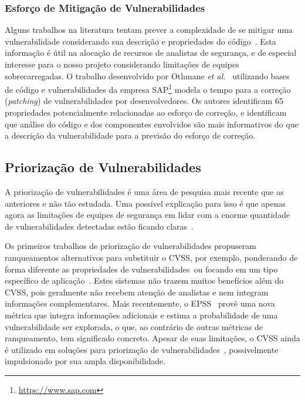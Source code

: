 \subsubsection{Esforço de Mitigação de Vulnerabilidades}

Alguns trabalhos na literatura tentam prever a complexidade de se mitigar uma vulnerabilidade considerando sua descrição e propriedades do código~\cite{zhang2013predicting}. Esta informação é útil na alocação de recursos de analistas de segurança, e de especial interesse para o nosso projeto considerando limitações de equipes sobrecarregadas. O trabalho desenvolvido por Othmane \emph{et al.}~\cite{ben2015factors, ben2017time} utilizando bases de código e vulnerabilidades da empresa SAP\footnote{\url{https://www.sap.com}} modela o tempo para a correção (\emph{patching}) de vulnerabilidades por desenvolvedores. Os autores identificam 65 propriedades potencialmente relacionadas ao esforço de correção, e identificam que análise do código e dos componentes envolvidos são mais informativos do que a descrição da vulnerabilidade para a previsão do esforço de correção.

\subsection{Priorização de Vulnerabilidades}\label{sec:art.prio}

A priorização de vulnerabilidades é uma área de pesquisa mais recente que as anteriores e não tão estudada. Uma possível explicação para isso é que apenas agora as limitações de equipes de segurança em lidar com a enorme quantidade de vulnerabilidades detectadas estão ficando claras~\cite{shameli2020efficient}.

Os primeiros trabalhos de priorização de vulnerabilidades propuseram ranqueamentos alternativos para substituir o CVSS, por exemplo, ponderando de forma diferente as propriedades de vulnerabilidades~\cite{spanos2013wivss}ou focando em um tipo específico de aplicação~\cite{rao2010security}. Estes sistemas não trazem muitos benefícios além do CVSS, pois geralmente não recebem atenção de analistas e nem integram informações complementares. Mais recentemente, o EPSS~\cite{jacobs2021epss} provê uma nova métrica que integra informações adicionais e estima a probabilidade de uma vulnerabilidade ser explorada, o que, ao contrário de outras métricas de ranqueamento, tem significado concreto. Apesar de suas limitações, o CVSS ainda é utilizado em soluções para priorização de vulnerabilidades~\cite{vasilyev2021cybersecurity, santoso2023vulnerability}, possivelmente impulsionado por sua ampla disponibilidade.

